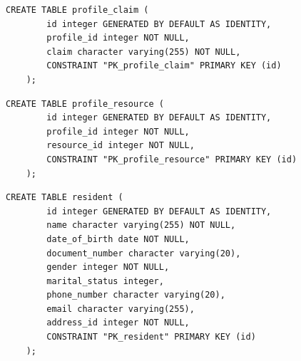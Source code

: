 \begin{quadro}[H]
	\caption[Script SQL --- Tabela \texttt{profile\_claim}]{Script SQL --- Tabela \texttt{profile\_claim}}
	\label{quadro:script-profile-claim}
	
	\begin{minipage}{0.96\textwidth}
		\begin{lstlisting}[style=academic-sql]
	CREATE TABLE profile_claim (
		id integer GENERATED BY DEFAULT AS IDENTITY,
		profile_id integer NOT NULL,
		claim character varying(255) NOT NULL,
		CONSTRAINT "PK_profile_claim" PRIMARY KEY (id)
	);
		\end{lstlisting}
	\end{minipage}
	
\end{quadro}

\begin{quadro}[H]
	\caption[Script SQL --- Tabela \texttt{profile\_resource}]{Script SQL --- Tabela \texttt{profile\_resource}}
	\label{quadro:script-profile-resource}
	
	\begin{minipage}{0.96\textwidth}
		\begin{lstlisting}[style=academic-sql]
	CREATE TABLE profile_resource (
		id integer GENERATED BY DEFAULT AS IDENTITY,
		profile_id integer NOT NULL,
		resource_id integer NOT NULL,
		CONSTRAINT "PK_profile_resource" PRIMARY KEY (id)
	);
		\end{lstlisting}
	\end{minipage}
	
\end{quadro}

\begin{quadro}[H]
	\caption[Script SQL --- Tabela \texttt{resident}]{Script SQL --- Tabela \texttt{resident}}
	\label{quadro:script-resident}
	
	\begin{minipage}{0.96\textwidth}
		\begin{lstlisting}[style=academic-sql]
	CREATE TABLE resident (
		id integer GENERATED BY DEFAULT AS IDENTITY,
		name character varying(255) NOT NULL,
		date_of_birth date NOT NULL,
		document_number character varying(20),
		gender integer NOT NULL,
		marital_status integer,
		phone_number character varying(20),
		email character varying(255),
		address_id integer NOT NULL,
		CONSTRAINT "PK_resident" PRIMARY KEY (id)
	);
		\end{lstlisting}
	\end{minipage}
	
\end{quadro}

